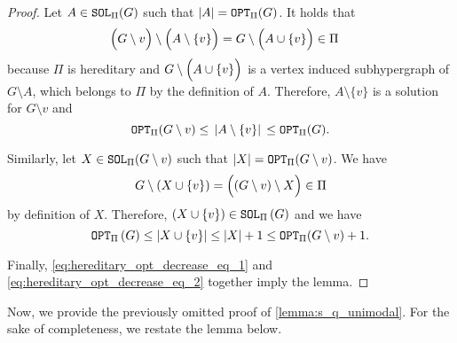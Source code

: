 \documentclass[letterpaper,11pt]{article}
\newcommand{\abs}[1]{{\left| #1\right|}}
\newcommand{\1}[1]{\mathds{1}\left[#1\right]}
\newcommand{\sat}{\textnormal{\texttt{SOL}}}
\newcommand{\OPT}{\textnormal{\texttt{OPT}}}
\begin{document}
\heredoptdecrease*
\begin{proof}
	Let $A \in \sat_{\Pi}(G)$ such that $\abs{A} = \OPT_{\Pi}(G)$.
	It holds that
	\begin{align*}
		\Bigl(G \setminus v\Bigr) \setminus \Bigl(A \setminus \{v\} \Bigr) &= G \setminus \Bigl(A \cup \{v\} \Bigr) \in \Pi
	\end{align*}
	because $\Pi$ is hereditary and $G \setminus \Bigl(A \cup \{v\} \Bigr)$ is a vertex induced subhypergraph of $G \setminus A$, which belongs to $\Pi$ by the definition of $A$.
	Therefore, $A \setminus \{v\}$ is a solution for $G \setminus v$ and
	\begin{equation}\label{eq:hereditary_opt_decrease_eq_1}
		\OPT_{\Pi}(G \setminus v ) \leq \,\abs{A \setminus \{v\} }\, \leq \OPT_{\Pi}(G).
	\end{equation}

	Similarly, let $X \in \sat_{\Pi}(G \setminus v)$ such that $\abs{X} = \OPT_{\Pi}( G \setminus v )$.
	We have
	\begin{align*}
		G \setminus \left( X \cup \{v\}  \right) = \Bigl(\left( G \setminus v \right) \setminus X \Bigr)\in \Pi 
	\end{align*}
	by definition of $X$. Therefore, $( X \cup \{v\}) \in \sat_{\Pi}\left( G \right) $ and we have
	\begin{equation}\label{eq:hereditary_opt_decrease_eq_2}
		\OPT_{\Pi}\left( G  \right) \leq \abs{X \cup \{v\} } \leq \abs{X} + 1 \leq \OPT_{\Pi}( G \setminus v ) + 1.
	\end{equation}

	Finally, \eqref{eq:hereditary_opt_decrease_eq_1} and \eqref{eq:hereditary_opt_decrease_eq_2} together imply the lemma.
\end{proof}

Now, we provide the previously omitted proof of \cref{lemma:s_q_unimodal}. For the sake of completeness, we restate the lemma below.

\squnimodal*
\end{document}
